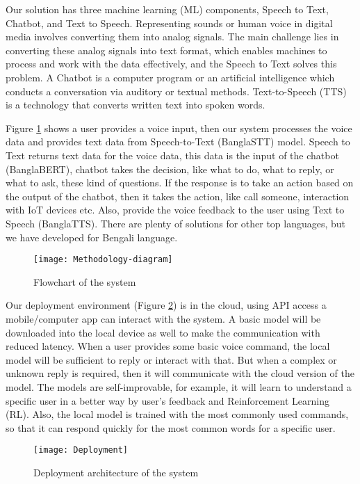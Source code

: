 Our solution has three machine learning (ML) components, Speech to Text, Chatbot, and Text to Speech.
Representing sounds or human voice in digital media involves converting them into analog signals.
The main challenge lies in converting these analog signals into text format, which enables machines to process and work with the data effectively, and the Speech to Text solves this problem\cite{speech-recog-bengali}.
A Chatbot is a computer program or an artificial intelligence which conducts a conversation via auditory or textual methods\cite{chatbot}.
Text-to-Speech (TTS) is a technology that converts written text into spoken words\cite{text-to-speech}.

Figure \ref{fig:methodology} shows a user provides a voice input, then our system processes the voice data and provides text data from Speech-to-Text (BanglaSTT)\cite{bangla-stt} model.
Speech to Text returns text data for the voice data, this data is the input of the chatbot (BanglaBERT)\cite{bangla-bert}, chatbot takes the decision, like what to do, what to reply, or what to ask, these kind of questions.
If the response is to take an action based on the output of the chatbot, then it takes the action, like call someone, interaction with IoT devices etc.
Also, provide the voice feedback to the user using Text to Speech (BanglaTTS)\cite{bangla-tts}.
There are plenty of solutions for other top languages, but we have developed for Bengali language.

\begin{figure}
    \centering
    \texttt{[image: Methodology-diagram]}
    \caption{Flowchart of the system}\label{fig:methodology}
\end{figure}

Our deployment environment (Figure \ref{fig:deployment}) is in the cloud, using API access a mobile/computer app can interact with the system.
A basic model will be downloaded into the local device as well to make the communication with reduced latency.
When a user provides some basic voice command, the local model will be sufficient to reply or interact with that.
But when a complex or unknown reply is required, then it will communicate with the cloud version of the model.
The models are self-improvable, for example, it will learn to understand a specific user in a better way by user's feedback and Reinforcement Learning (RL).
Also, the local model is trained with the most commonly used commands, so that it can respond quickly for the most common words for a specific user.

\begin{figure}
    \centering
    \texttt{[image: Deployment]}
    \caption{Deployment architecture of the system}\label{fig:deployment}
\end{figure}
